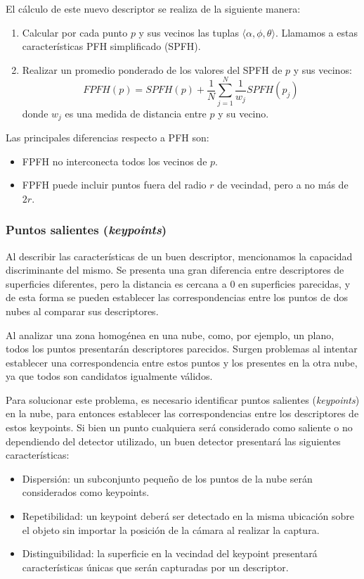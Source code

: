 El cálculo de este nuevo descriptor se realiza de la siguiente manera:
\begin{enumerate}
	\item Calcular por cada punto $p$ y sus vecinos las tuplas $\langle \alpha, \phi, \theta \rangle$.
		Llamamos a estas características PFH simplificado (SPFH).
	\item Realizar un promedio ponderado de los valores del SPFH de $p$ y sus vecinos:
		\[
			FPFH(p) = SPFH(p) + \frac{1}{N} \sum_{j=1}^{N} \frac{1}{w_j} SPFH(p_j)
		\]
		donde $w_j$ es una medida de distancia entre $p$ y su vecino.
\end{enumerate}
Las principales diferencias respecto a PFH son:
\begin{itemize}
	\item FPFH no interconecta todos los vecinos de $p$.
	\item FPFH puede incluir puntos fuera del radio $r$ de vecindad, pero a no más de $2r$.
\end{itemize}


\subsubsection{Puntos salientes (\emph{keypoints})}
Al describir las características de un buen descriptor, mencionamos la capacidad discriminante del mismo.
Se presenta una gran diferencia entre descriptores de superficies diferentes,
pero la distancia es cercana a $0$ en superficies parecidas,
y de esta forma se pueden establecer las correspondencias entre los puntos de dos nubes
al comparar sus descriptores.

Al analizar una zona homogénea en una nube, como, por ejemplo, un plano,
todos los puntos presentarán descriptores parecidos.
Surgen problemas al intentar establecer una correspondencia entre estos puntos
y los presentes en la otra nube, ya que todos son candidatos igualmente válidos.

Para solucionar este problema, es necesario identificar puntos salientes (\emph{keypoints})
en la nube, para entonces establecer las correspondencias entre los descriptores de estos keypoints.
Si bien un punto cualquiera será considerado como saliente o no dependiendo del detector utilizado,
un buen detector presentará las siguientes características:
\begin{itemize}
	\item Dispersión: un subconjunto pequeño de los puntos de la nube serán considerados como keypoints.
	\item Repetibilidad: un keypoint deberá ser detectado en la misma ubicación
		sobre el objeto sin importar la posición de la cámara al realizar la captura.
	\item Distinguibilidad: la superficie en la vecindad del keypoint
		presentará características únicas que serán capturadas por un descriptor.
\end{itemize}

